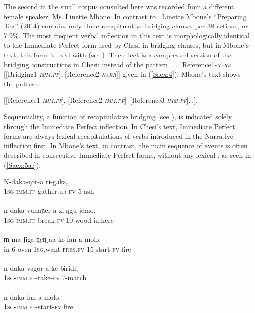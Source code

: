\documentclass[output=paper]{LSP/langsci}
\begin{document}
The second  in the small corpus consulted here was recorded from a different female speaker, Ms. Linette Mbone. In contrast to \citet{Chesi2014}, Linette Mbone’s  ``Preparing Tea'' (2014) contains only three recapitulative bridging clauses per 38 actions, or 7.9\%. The most frequent verbal inflection in this text is morphologically identical to the Immediate Perfect form used by Chesi in bridging clauses, but in Mbone’s text, this form is used with   (see ). The effect is a compressed version of the bridging constructions in Chesi: instead of the pattern [... [Reference1-\textit{\textsc{narr}}]] [[Bridging1-\textit{\textsc{imm.pf}}], [Reference2-\textit{\textsc{narr}}]] given in (\ref{Saex:4}), Mbone’s text shows the pattern: 
\begin{center}
{[[Reference1-\textit{\textsc{imm.pf}}], [Reference2-\textit{\textsc{imm.pf}}], [Reference3-\textit{\textsc{imm.pf}}]...]}.\end{center} Sequentiality, a function of recapitulative bridging (see ), is indicated solely through the Immediate Perfect inflection.\hspace{.2em} In Chesi’s text, Immediate Perfect forms are always lexical recapitulations of verbs introduced in the Narrative inflection first. In Mbone’s text, in contrast, the main sequence of events is often described in consecutive Immediate Perfect forms, without any lexical , as seen in (\ref{Saex:5ae}):


\begin{exe}
\ex \label{Saex:5ae}
\begin{xlist}
\ex \label{Saex:5a}
\gll N-daka-ŋor-a       ri-gɔkɛ,\\
\textsc{1sg-imm.pf}-gather.up-\textsc{fv}  \textsc{5}-ash\\
\glt {}\\
\ex \label{Saex:5b}
\gll n-daka-vunaɲer-a     zi-ŋgu     jemo,\\
\textsc{1sg-imm.pf-}break-\textsc{fv}  \textsc{10}-wood  in.here\\
\glt {}\\
\ex \label{Saex:5c}
\gll m̩   ma-ʃiga   n̪en̪-aa       ko-fan-a   molo,\\
in  \textsc{6}-oven    \textsc{1sg.}want-\textsc{pres.fv}  \textsc{15}-start-\textsc{fv}  fire\\
\glt {}\\
\ex \label{Saex:5d}
\gll n-daka-vogor-a   ke-biridi,\\     	       
   \textsc{1sg-imm.pf-}take-\textsc{fv}  \textsc{7}-match\\
\glt {} \\
\ex \label{Saex:5e}
\gll n-daka-fan-a       molo.\\     	       
    \textsc{1sg-imm.pf-}start-\textsc{fv}  fire\\
\glt {} 
\end{xlist}
\end{exe}
\end{document}
